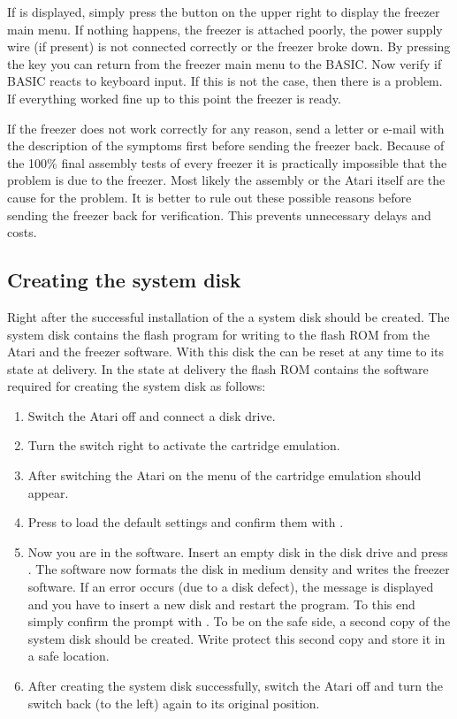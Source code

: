 If  is displayed, simply press the  button on the
upper right to display the freezer main menu. If nothing happens, the freezer is
attached poorly, the power supply wire (if present) is not connected correctly
or the freezer broke down. By pressing the  key you can return from
the freezer main menu to the BASIC. Now verify if BASIC reacts to keyboard
input. If this is not the case, then there is a problem. If everything worked
fine up to this point the freezer is ready.

If the freezer does not work correctly for any reason, send a letter or e-mail
with the description of the symptoms first before sending the freezer back.
Because of the 100\% final assembly tests of every freezer it is practically
impossible that the problem is due to the freezer. Most likely the assembly or
the Atari itself are the cause for the problem. It is better to rule out these
possible reasons before sending the freezer back for verification. This prevents
unnecessary delays and costs.

\subsection{Creating the system disk}

Right after the successful installation of the \frz a system disk should be
created. The system disk contains the flash program for writing to the flash ROM
from the Atari and the freezer software. With this disk the \frz can be reset
at any time to its state at delivery. In the state at delivery the flash ROM
contains the software required for creating the system disk as follows:

\begin{enumerate}
\item Switch the Atari off and connect a disk drive.
\item Turn the  switch right to activate the cartridge emulation.
\item After switching the Atari on the menu of the cartridge emulation should
appear.
\item Press  to load the default settings and confirm them with .
\item Now you are in the  software. Insert an empty
disk in the disk drive  and press . The software now
formats the disk in medium density and writes the freezer software.
If an error occurs (\eg due to a disk defect), the message  is
displayed and you have to insert a new disk and restart the program. To this
end simply confirm the  prompt with .
To be on the safe side, a second copy of the system disk should be created.
Write protect this second copy and store it in a safe location.
\item After creating the system disk successfully, switch the Atari off and turn
the\linebreak
{} switch back (to the left) again to its original position.
\end{enumerate}

